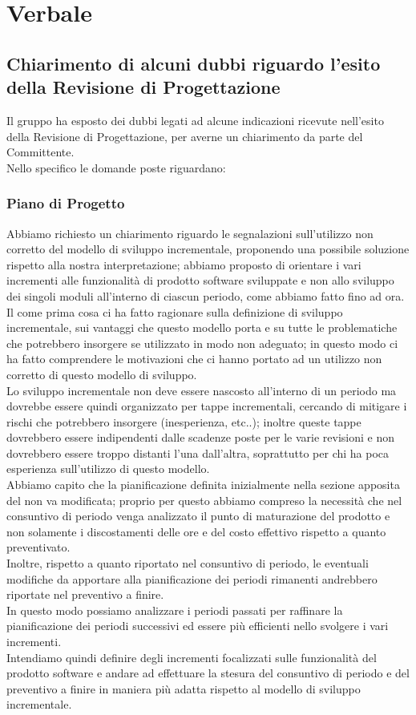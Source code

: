 \section{Verbale}
\subsection{Chiarimento di alcuni dubbi riguardo l'esito della Revisione di Progettazione}
Il gruppo ha esposto dei dubbi legati ad alcune indicazioni ricevute nell'esito della Revisione di Progettazione, per averne un chiarimento da parte del Committente. \\
Nello specifico le domande poste riguardano:

	\subsubsection*{Piano di Progetto}
	Abbiamo richiesto un chiarimento riguardo le segnalazioni sull'utilizzo non corretto del modello di sviluppo incrementale, proponendo una possibile soluzione rispetto alla nostra interpretazione; abbiamo proposto di orientare i vari incrementi alle funzionalità di prodotto software sviluppate e non allo sviluppo dei singoli moduli all'interno di ciascun periodo, come abbiamo fatto fino ad ora. \\
	Il \TV{} come prima cosa ci ha fatto ragionare sulla definizione di sviluppo incrementale, sui vantaggi che questo modello porta e su tutte le problematiche che potrebbero insorgere se utilizzato in modo non adeguato; in questo modo ci ha fatto comprendere le motivazioni che ci hanno portato ad un utilizzo non corretto di questo modello di sviluppo. \\
	Lo sviluppo incrementale non deve essere nascosto all'interno di un periodo ma dovrebbe essere quindi organizzato per tappe incrementali, cercando di mitigare i rischi che potrebbero insorgere (inesperienza, etc..); inoltre queste tappe dovrebbero essere indipendenti dalle scadenze poste per le varie revisioni e non dovrebbero essere troppo distanti l'una dall'altra, soprattutto per chi ha poca esperienza sull'utilizzo di questo modello. \\
	Abbiamo capito che la pianificazione definita inizialmente nella sezione apposita del \PdP{} non va modificata; proprio per questo abbiamo compreso la necessità che nel consuntivo di periodo venga analizzato il punto di maturazione del prodotto e non solamente i discostamenti delle ore e del costo effettivo rispetto a quanto preventivato. \\
	Inoltre, rispetto a quanto riportato nel consuntivo di periodo, le eventuali modifiche da apportare alla pianificazione dei periodi rimanenti andrebbero riportate nel preventivo a finire. \\
	In questo modo possiamo analizzare i periodi passati per raffinare la pianificazione dei periodi successivi ed essere più efficienti nello svolgere i vari incrementi. \\
	Intendiamo quindi definire degli incrementi focalizzati sulle funzionalità del prodotto software e andare ad effettuare la stesura del consuntivo di periodo e del preventivo a finire in maniera più adatta rispetto al modello di sviluppo incrementale.
	 
